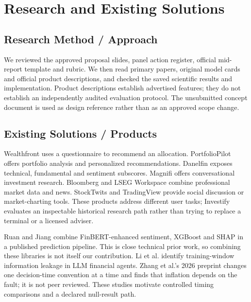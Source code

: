 \chapter{Research and Existing Solutions}
\label{chap:research}
\section{Research Method / Approach}
We reviewed the approved proposal slides, panel action register, official mid-report template and rubric. We then read primary papers, original model cards and official product descriptions, and checked the saved scientific results and implementation. Product descriptions establish advertised features; they do not establish an independently audited evaluation protocol. The unsubmitted concept document is used as design reference rather than as an approved scope change.
\section{Existing Solutions / Products}
Wealthfront uses a questionnaire to recommend an allocation\cite{wealthfront_product}. PortfolioPilot offers portfolio analysis and personalized recommendations\cite{portfoliopilot_product}. Danelfin exposes technical, fundamental and sentiment subscores\cite{danelfin_product}. Magnifi offers conversational investment research\cite{magnifi_product}. Bloomberg and LSEG Workspace combine professional market data and news\cite{bloomberg_product,lseg_product}. StockTwits and TradingView provide social discussion or market-charting tools\cite{stocktwits_product,tradingview_product}. These products address different user tasks; Investify evaluates an inspectable historical research path rather than trying to replace a terminal or a licensed adviser.

Ruan and Jiang combine FinBERT-enhanced sentiment, XGBoost and SHAP in a published prediction pipeline\cite{ruan_jiang_2025}. This is close technical prior work, so combining these libraries is not itself our contribution. Li et al. identify training-window information leakage in LLM financial agents\cite{profit_mirage_2025}. Zhang et al.'s 2026 preprint changes one decision-time convention at a time and finds that inflation depends on the fault\cite{alpha_disappears_2026}; it is not peer reviewed. These studies motivate controlled timing comparisons and a declared null-result path.
